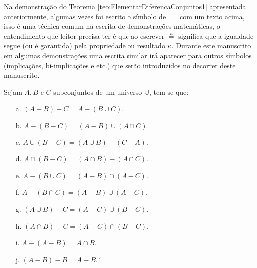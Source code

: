 \begin{note}
	Na demonstração do Teorema \ref{teo:ElementarDiferencaConjuntos1} apresentada anteriormente, algumas vezes foi escrito o símbolo de $=$ com um texto acima, isso é uma técnica comum na escrita de demonstrações matemáticas, o entendimento que leitor precisa ter é que ao escrever $\stackrel{\kappa}{=}$ significa que a igualdade segue (ou é garantida) pela propriedade ou resultado $\kappa$. Durante este manuscrito em algumas demonstrações uma escrita similar irá aparecer para outros símbolos (implicações, bi-implicações e etc.) que serão introduzidos no decorrer deste manuscrito.
\end{note}

\begin{theorem}\label{teo:ElementarDiferencaConjuntos2}
	Sejam $A, B$ e $C$ subconjuntos de um universo $\mathbb{U}$, tem-se que:
	\begin{itemize}
		\item[a.] $(A - B) - C = A - (B \cup C)$.
		\item[b.] $A - (B - C) = (A - B) \cup (A \cap C)$.
		\item[c.] $A \cup (B - C) = (A \cup B) - (C - A)$.
		\item[d.] $A \cap (B - C) = (A \cap B) - (A \cap C)$.
		\item[e.] $A - (B \cup C) = (A - B) \cap (A - C)$.
		\item[f.] $A - (B \cap C) = (A - B) \cup (A - C)$.
		\item[g.] $(A \cup B) - C = (A - C) \cup (B - C)$.
		\item[h.] $(A \cap B) - C = (A - C) \cap (B - C)$.
		\item[i.] $A - (A - B) = A \cap B$.
		\item[j.] $(A - B) - B = A - B$.´
	\end{itemize}
\end{theorem}

